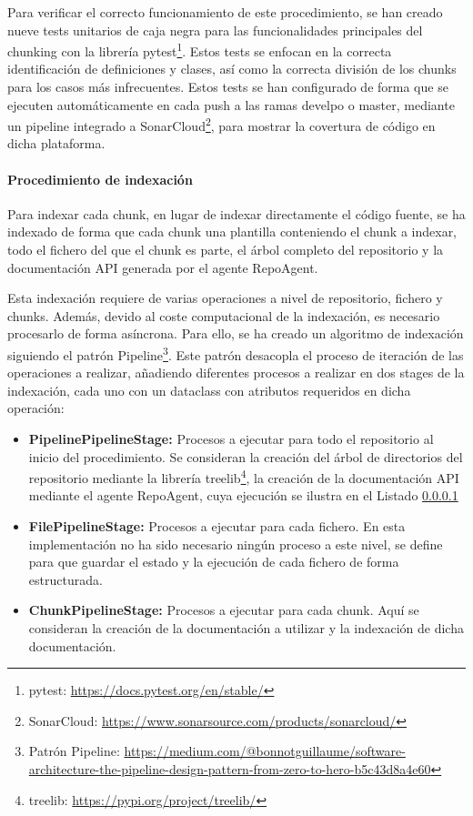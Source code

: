 Para verificar el correcto funcionamiento de este procedimiento, se han creado nueve tests unitarios de caja negra para las funcionalidades principales del chunking con la librería pytest\footnote{pytest: \url{https://docs.pytest.org/en/stable/}}. Estos tests se enfocan en la correcta identificación de definiciones y clases, así como la correcta división de los chunks para los casos más infrecuentes. Estos tests se han configurado de forma que se ejecuten automáticamente en cada push a las ramas develpo o master, mediante un pipeline integrado a SonarCloud\footnote{SonarCloud: \url{https://www.sonarsource.com/products/sonarcloud/}}, para mostrar la covertura de código en dicha plataforma.  

\paragraph{Procedimiento de indexación}
Para indexar cada chunk, en lugar de indexar directamente el código fuente, se ha indexado de forma que cada chunk una plantilla conteniendo el chunk a indexar, todo el fichero del que el chunk es parte, el árbol completo del repositorio y la documentación API generada por el agente RepoAgent.  

Esta indexación requiere de varias operaciones a nivel de repositorio, fichero y chunks. Además, devido al coste computacional de la indexación, es necesario procesarlo de forma asíncrona. Para ello, se ha creado un algoritmo de indexación siguiendo el patrón Pipeline\footnote{Patrón Pipeline: \url{https://medium.com/@bonnotguillaume/software-architecture-the-pipeline-design-pattern-from-zero-to-hero-b5c43d8a4e60}}. Este patrón desacopla el proceso de iteración de las operaciones a realizar, añadiendo diferentes procesos a realizar en dos stages de la indexación, cada uno con un dataclass con atributos requeridos en dicha operación:
\begin{itemize}
  \item\textbf{PipelinePipelineStage: }Procesos a ejecutar para todo el repositorio al inicio del procedimiento. Se consideran la creación del árbol de directorios del repositorio mediante la librería treelib\footnote{treelib: \url{https://pypi.org/project/treelib/}}, la creación de la documentación API mediante el agente RepoAgent, cuya ejecución se ilustra en el Listado \ref{} 
  \item\textbf{FilePipelineStage: }Procesos a ejecutar para cada fichero. En esta implementación no ha sido necesario ningún proceso a este nivel, se define para que guardar el estado y la ejecución de cada fichero de forma estructurada. 
  \item\textbf{ChunkPipelineStage: }Procesos a ejecutar para cada chunk. Aquí se consideran la creación de la documentación a utilizar y la indexación de dicha documentación. 
\end{itemize}

